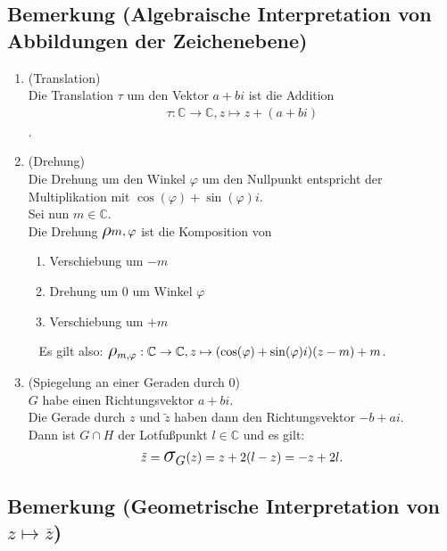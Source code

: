 	
\subsection[Algebraische Interpretation von Abbildungen der Zeichenebene]{Bemerkung (Algebraische Interpretation von Abbildungen der Zeichenebene)}

	\begin{enumerate}
	\item (Translation)\\
	Die Translation $\tau$ um den Vektor $a+bi$ ist die Addition
	\begin{align*}
	\tau : \mathbb{C}\rightarrow\mathbb{C}, z\mapsto z+(a+bi)
	\end{align*}.
	
	\item (Drehung)\\
	Die Drehung um den Winkel $\varphi$ um den Nullpunkt entspricht der Multiplikation mit 
	$\cos(\varphi)+\sin(\varphi)i$.\\ \newline
	Sei nun $m\in\mathbb{C}$.\\ \newline
	Die Drehung $\mathlll{\rho}{m,\varphi}$ ist die Komposition von
		\begin{enumerate}
		\item Verschiebung um $-m$
		\item Drehung um 0 um Winkel $\varphi$
		\item Verschiebung um $+m$
		\end{enumerate}
		~\newline
	Es gilt also: $\mathlll{\rho}_{m,\varphi}: \mathbb{C}\rightarrow\mathbb{C}, 
	z\mapsto (\cos(\varphi)+\sin(\varphi)i)(z-m)+m$.
	
	\item (Spiegelung an einer Geraden durch 0)\\
	$G$ habe einen Richtungsvektor $a+bi$.\\ 
	Die Gerade durch $z$ und $\tilde{z}$ haben dann den Richtungsvektor	$-b+ai$.\\
	Dann ist $G\cap H$ der Lotfußpunkt $l\in\mathbb{C}$ und es gilt:
	\begin{align*}
	\tilde{z}=\mathlll{\sigma}_G(z)=z+2(l-z)=-z+2l.
	\end{align*}
	
	\end{enumerate}
	
	
\subsection[Geometrische Interpretation von $z\mapsto\overline{z}$]{Bemerkung (Geometrische Interpretation von $z\mapsto\overline{z}$)}

